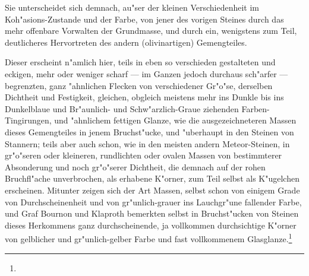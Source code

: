 \documentclass[a4paper, 11pt, oneside, german]{article}
\begin{document}
Sie unterscheidet sich demnach, au"ser der kleinen Verschiedenheit im Koh"asions-Zustande und der Farbe, von jener des vorigen Steines durch das mehr offenbare Vorwalten der Grundmasse, und durch ein, wenigstens zum Teil, deutlicheres Hervortreten des andern (olivinartigen) Gemengteiles.

Dieser erscheint n"amlich hier, teils in eben so verschieden gestalteten und eckigen, mehr oder weniger scharf --- im Ganzen jedoch durchaus sch"arfer --- begrenzten, ganz "ahnlichen Flecken von verschiedener Gr"o"se, derselben Dichtheit und Festigkeit, gleichen, obgleich meistens mehr ins Dunkle bis ins Dunkelblaue und Br"aunlich- und Schw"arzlich-Graue ziehenden Farben-Tingirungen, und "ahnlichem fettigen Glanze, wie die ausgezeichneteren Massen dieses Gemengteiles in jenem Bruchst"ucke, und "uberhaupt in den Steinen von Stannern; teils aber auch schon, wie in den meisten andern Meteor-Steinen, in gr"o"seren oder kleineren, rundlichten oder ovalen Massen von bestimmterer Absonderung und noch gr"o"serer Dichtheit, die demnach auf der rohen Bruchfl"ache unverbrochen, als erhabene K"orner, zum Teil selbst als K"ugelchen erscheinen. Mitunter zeigen sich der Art Massen, selbst schon von einigem Grade von Durchscheinenheit und von gr"unlich-grauer ins Lauchgr"une fallender Farbe, und Graf Bournon und Klaproth bemerkten selbst in Bruchst"ucken von Steinen dieses Herkommens ganz durchscheinende, ja vollkommen durchsichtige K"orner von gelblicher und gr"unlich-gelber Farbe und fast vollkommenem Glasglanze.\footnote{}
\end{document}
